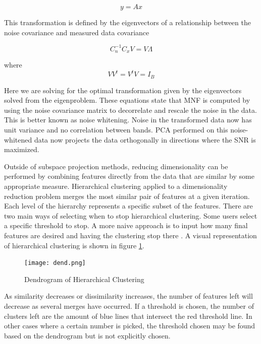 \documentclass[conference,onecolumn]{IEEEtran}
\begin{document}
\begin{equation}
y=Ax
\end{equation}

This transformation is defined by the eigenvectors of a relationship between the noise covariance and measured data covariance

\begin{equation}
C_{n}^{-1}C_{x}V=V\Lambda
\end{equation}

where
\begin{equation}
VV^{t}=V^{t}V=I_{B}
\end{equation}

Here we are solving for the optimal transformation given by the eigenvectors solved from the eigenproblem. These equations state that MNF is computed by using the noise covariance matrix to decorrelate and rescale the noise in the data. This is better known as noise whitening. Noise in the transformed data now has unit variance and no correlation between bands. PCA performed on this noise-whitened data now projects the data orthogonally in directions where the SNR is maximized. 

Outside of subspace projection methods, reducing dimensionality can be performed by combining features directly from the data that are similar by some appropriate measure. Hierarchical clustering applied to a dimensionality reduction problem merges the most similar pair of features at a given iteration. Each level of the hierarchy represents a specific  subset of the features. There are two main ways of selecting when to stop hierarchical clustering. Some users select a specific threshold to stop. A more naive approach is to input how many final features are desired and having the clustering stop there \cite{statlearn}. A visual representation of hierarchical clustering is shown in figure \ref{fig:dendrogram}.

\begin{figure}[H]
	\centering
	\texttt{[image: dend.png]}
	\caption{Dendrogram of Hierarchical Clustering}
	\label{fig:dendrogram}
\end{figure}

As similarity decreases or dissimilarity increases, the number of features left will decrease as several merges have occurred. If a threshold is chosen, the number of clusters left are the amount of blue lines that intersect the red threshold line. In other cases where a certain number is picked, the threshold chosen may be found based on the dendrogram but is not explicitly chosen. 
\end{document}

